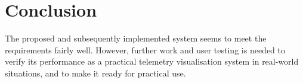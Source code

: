 \begin{comment}

\end{comment}

\section{Conclusion}
The proposed and subsequently implemented system seems to meet the requirements fairly well. However, further work and user testing is needed to verify its performance as a practical telemetry visualisation system in real-world situations, and to make it ready for practical use.

